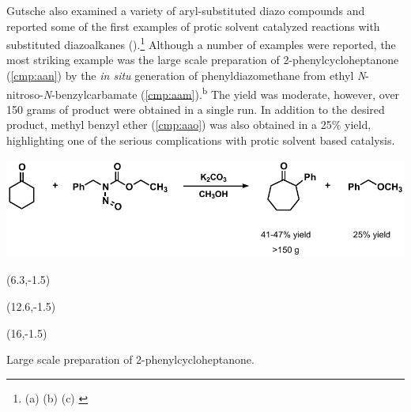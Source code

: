 Gutsche also examined a variety of aryl-substituted diazo compounds and reported
some of the first examples of protic solvent catalyzed reactions with substituted diazoalkanes
().\footnote{(a)  (b)
 (c)  \label{ref:gutsub}} Although a number of examples were
reported, the most striking example was the large scale preparation of
2-phenylcycloheptanone (\ref{cmp:aan}) by the \textit{in situ} generation of
phenyldiazomethane from ethyl
\textit{N}-nitroso-\textit{N}-benzylcarbamate
(\ref{cmp:aam}).\textsuperscript{b} The yield was
moderate, however, over 150 grams of product were obtained in a single run. In addition
to the desired product, methyl benzyl ether (\ref{cmp:aao}) was also obtained in
a 25\% yield, highlighting one of the serious complications with protic solvent
based catalysis.
\begin{Scheme}[h]
  \centering
  \includegraphics[scale=0.8]{chp_diazobkg/images/gutorgsyn}
  \begin{textblock}{1}(6.3,-1.5)  \end{textblock}
  \begin{textblock}{1}(12.6,-1.5)  \end{textblock}
  \begin{textblock}{1}(16,-1.5)  \end{textblock}
  \caption{Large scale preparation of 2-phenylcycloheptanone.}
  \label{sch:gutorgsyn}
\end{Scheme}



